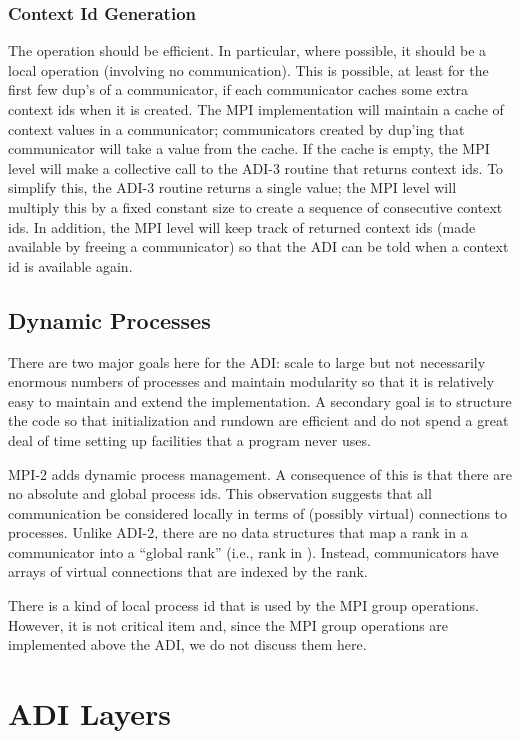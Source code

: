 \subsubsection{Context Id Generation}
\label{sec:context-id-generation}
The operation  should be efficient.  In particular,
where possible, it should be a local operation (involving no
communication).  This is possible, at least for the first few dup's of
a communicator, if each communicator caches some extra context ids
when it is created.  The MPI implementation will maintain a cache of
context values in a communicator; communicators created by dup'ing
that communicator will take a value from the cache.  If the cache is
empty, the MPI level will make a collective call to the ADI-3 routine
that returns context ids.  To simplify this, the ADI-3 routine returns
a single value; the MPI level will multiply this by a fixed constant
size to create a sequence of consecutive context ids.  In addition,
the MPI level will keep track of returned context ids (made available
by freeing a communicator) so that the ADI can be told when a context
id is available again.

\subsection{Dynamic Processes}
There are two major goals here for the ADI:  scale to large but not
necessarily enormous numbers of processes and maintain modularity so
that it is relatively easy to maintain and extend the implementation.
A secondary goal is to structure the code so that initialization and
rundown are efficient and do not spend a great deal of time setting up
facilities that a program never uses.

MPI-2 adds dynamic process management.  A consequence of this is that
there are no absolute and global process ids.  This observation
suggests that all communication be considered locally in terms of
(possibly virtual) connections to processes.  Unlike ADI-2, there are
no data structures that map a rank in a communicator into a ``global
rank'' (i.e., rank in ).  Instead, communicators
have arrays of virtual connections that are indexed by the rank.

There is a kind of local process id that is used by the MPI group
operations.  However, it is not critical item and, since the MPI group
operations are implemented above the ADI, we do not discuss them here.

\section{ADI Layers}
\label{sec:layers}

